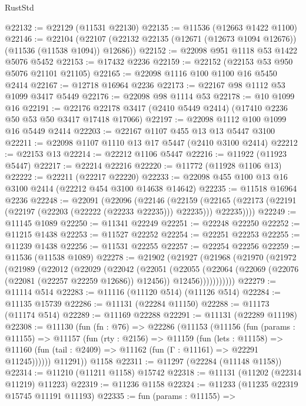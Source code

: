 \begin{lexlean}{RustStd}
\begin{coremodule}
@22132 := @22129 (@11531 @22130)
@22135 := @11536 (@12663 @1422 @1100)
@22146 := @22104
    (@22107 (@22132 @22135 (@12671 (@12673 @1094 @12676)) (@11536 (@11538 @1094)) @12686))
@22152 := @22098 @951 @1118 @53 @1422 @5076 @5452
@22153 := @17432 @2236
@22159 := @22152 (@22153 @53 @950 @5076 @21101 @21105)
@22165 := @22098 @1116 @100 @1100 @16 @5450 @2414
@22167 := @12718 @16964 @2236
@22173 := @22167 @98 @1112 @53 @1099 @3417 @5449
@22176 := @22098 @98 @1114 @53
@22178 := @10 @1099 @16
@22191 := @22176 @22178 @3417 (@2410 @5449 @2414) (@17410 @2236 @50 @53 @50 @3417 @17418 @17066)
@22197 := @22098 @1112 @100 @1099 @16 @5449 @2414
@22203 := @22167 @1107 @455 @13 @13 @5447 @3100
@22211 := @22098 @1107 @1110 @13 @17 @5447 (@2410 @3100 @2414)
@22212 := @22153 @13
@22214 := @22212 @1106 @5447
@22216 := @11922 (@11923 @5447)
@22217 := @22214 @22216
@22220 := @11772 (@11928 @1106 @13)
@22222 := @22211 (@22217 @22220)
@22233 := @22098 @455 @100 @13 @16 @3100 @2414 (@22212 @454 @3100 @14638 @14642)
@22235 := @11518 @16964 @2236
@22248 := @22091
    (@22096
      (@22146
        (@22159
          (@22165 (@22173 (@22191 (@22197 (@22203 (@22222 (@22233 @22235))) @22235))) @22235))))
@22249 := @11145 @1089
@22250 := @11341 @22249
@22251 := @22248 @22250
@22252 := @11215 @1438
@22253 := @11527 @22252
@22254 := @22251 @22253
@22255 := @11239 @1438
@22256 := @11531 @22255
@22257 := @22254 @22256
@22259 := @11536 (@11538 @1089)
@22278 := @21902
    (@21927
      (@21968
        (@21970
          (@21972
            (@21989
              (@22012
                (@22029
                  (@22042
                    (@22051
                      (@22055
                        (@22064
                          (@22069 (@22076 (@22081 (@22257 @22259 @12686)) @12456))
                          @12456)))))))))))
@22279 := @11114 @514
@22283 := @11116 (@11120 @514) (@11126 @514)
@22284 := @11135 @15739
@22286 := @11131 (@22284 @11150)
@22288 := @11173 (@11174 @514)
@22289 := @11169 @22288
@22291 := @11131 (@22289 @11198)
@22308 := @11130
    (fun (fn : @76) =>
    @22286
      (@11153
        (@11156
          (fun (params : @11155) =>
          @11157
            (fun (rty : @2156) =>
            @11159
              (fun (lets : @11158) =>
              @11160 (fun (tail : @2409) => @11162 (fun (Γ : @11161) => @22291 @11245))))))
        @11291))
    @1158
@22311 := @11297 (@22284 (@11148 @1158))
@22314 := @11210 (@11211 @1158) @15742
@22318 := @11131 (@11202 (@22314 @11219) @11223)
@22319 := @11236 @1158
@22324 := @11233 (@11235 @22319 @15745 @11191 @11193)
@22335 := fun (params : @11155) =>

\end{coremodule}
\end{lexlean}
